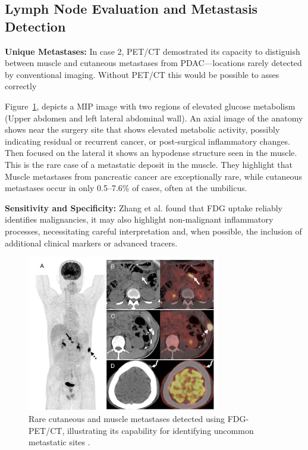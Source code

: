 \begin{multicols}{2}
\subsection{Lymph Node Evaluation and Metastasis Detection}

\textbf{Unique Metastases:} 
In case 2, PET/CT demostrated its capacity to distiguish between muscle and cutaneous metastases from PDAC—locations rarely detected by conventional imaging. Without PET/CT this would be possible to asses correctly

Figure~\ref{fig:Zhang1}, depicts a MIP image with two regions of elevated glucose metabolism (Upper abdomen and left lateral abdominal wall). An axial image of the anatomy shows near the surgery site that shows elevated metabolic activity, possibly indicating residual or recurrent cancer, or post-surgical inflammatory changes. Then focused on the lateral it shows an hypodense structure seen in the muscle. This is the rare case of a metastatic deposit in the muscle. They highlight that Muscle metastases from pancreatic cancer are exceptionally rare, while cutaneous metastases occur in only 0.5–7.6\% of cases, often at the umbilicus\cite{Zhang2023}.


\textbf{Sensitivity and Specificity:} Zhang et al. found that FDG uptake reliably identifies malignancies, it may also highlight non-malignant inflammatory processes, necessitating careful interpretation and, when possible, the inclusion of additional clinical markers or advanced tracers.


\end{multicols}

\begin{figure}[H]
	\centering
	\includegraphics[width=0.75\textwidth]{assets/Zhang1.png}
	\caption{Rare cutaneous and muscle metastases detected using FDG-PET/CT, illustrating its capability for identifying uncommon metastatic sites \cite{Zhang2023}.}
	\label{fig:Zhang1}
\end{figure}


